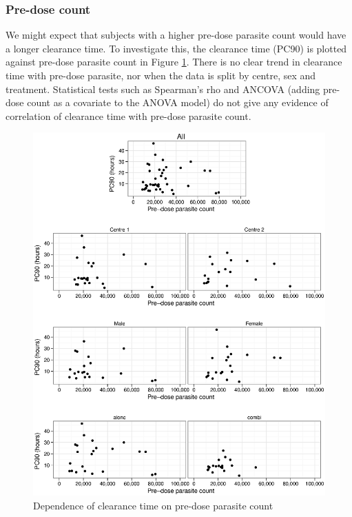 \subsubsection*{Pre-dose count}
We might expect that subjects with a higher pre-dose parasite count would have a longer clearance time. To investigate this, the clearance time (PC90) is plotted against pre-dose parasite count in Figure \ref{predose-ancova}. There is no clear trend in clearance time with pre-dose parasite, nor when the data is split by centre, sex and treatment. Statistical tests such as Spearman's rho and ANCOVA (adding pre-dose count as a covariate to the ANOVA model) do not give any evidence of correlation of clearance time with pre-dose parasite count.
\begin{figure}[p]
\includegraphics[width=6.5in]{predose-ancova.eps} 
\caption{Dependence of clearance time on pre-dose parasite count}
\label{predose-ancova}
\end{figure}

